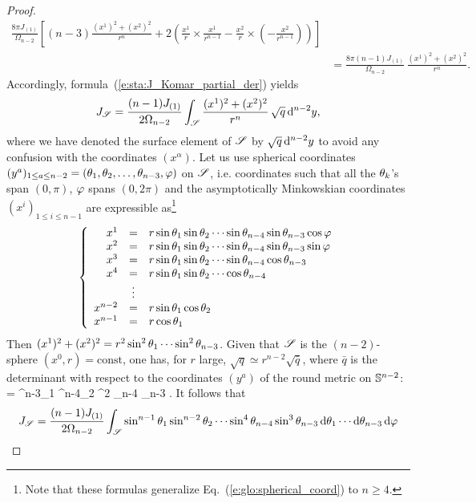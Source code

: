\begin{proof}
\begin{align}
   \frac{8\pi J_{(1)}}{\Omega_{n-2}} \left[
   (n-3) \frac{(x^1)^2 + (x^2)^2}{r^n} + 2 \left( \frac{x^1}{r}\times \frac{x^1}{r^{n-1}}
   - \frac{x^2}{r}\times \left(- \frac{x^2}{r^{n-1}} \right) \right) \right] \nonumber \\
   & = \frac{8\pi (n-1) J_{(1)}}{\Omega_{n-2}} \, \frac{(x^1)^2 + (x^2)^2}{r^n} . \nonumber
\end{align}
Accordingly, formula~(\ref{e:sta:J_Komar_partial_der}) yields
\[
    J_{\mathscr{S}} =  \frac{(n-1)J_{(1)}}{2\Omega_{n-2}}  \int_{\mathscr{S}}
    \frac{(x^1)^2 + (x^2)^2}{r^n} \, \sqrt{q}\, \mathrm{d}^{n-2} y ,
\]
where we have denoted the surface element of $\mathscr{S}$ by $\sqrt{q} \, \mathrm{d}^{n-2} y$
to avoid any
confusion with the coordinates $(x^\alpha)$.
Let us use spherical coordinates $(y^a)_{1\leq a \leq n-2} = (\theta_1,\theta_2,\ldots,\theta_{n-3},\varphi)$
on $\mathscr{S}$, i.e. coordinates such that all the $\theta_k$'s span $(0,\pi)$,
$\varphi$ spans $(0,2\pi)$
and the asymptotically Minkowskian coordinates
$(x^i)_{1\leq i \leq n-1}$ are expressible as\footnote{Note that these formulas generalize
Eq.~(\ref{e:glo:spherical_coord}) to $n\geq 4$.}
\[
    \left\{ \begin{array}{rcl}
    x^1 & = & r \sin\theta_1 \sin\theta_2 \cdots \sin \theta_{n-4} \sin \theta_{n-3} \cos\varphi \\
    x^2 & = & r \sin\theta_1 \sin\theta_2 \cdots \sin \theta_{n-4} \sin \theta_{n-3} \sin\varphi \\
    x^3 & = & r \sin\theta_1 \sin\theta_2 \cdots \sin \theta_{n-4} \cos \theta_{n-3} \\
    x^4 & = & r \sin\theta_1 \sin\theta_2 \cdots \cos \theta_{n-4} \\
     &\vdots & \\
    x^{n-2} & = & r \sin\theta_1 \cos\theta_2 \\
    x^{n-1} & = & r \cos\theta _1
     \end{array} \right .
\]
Then $(x^1)^2 + (x^2)^2 = r^2 \sin^2\theta_1 \cdots \sin^2 \theta_{n-3}$.
Given that $\mathscr{S}$ is the $(n-2)$-sphere $(x^0,r) = \mathrm{const}$, one has,
for $r$ large, $\sqrt{q} \simeq r^{n-2} \sqrt{\bar{q}}$,
where $\bar{q}$ is the determinant with respect to the coordinates
$(y^a)$ of the round metric on $\mathbb{S}^{n-2}$:
\be \label{e:sta:sqrt_barq_spher}
  = \sin^{n-3}\th_1 \sin^{n-4}\th_2 \cdots \sin^2 \th_{n-4} \sin \th_{n-3} .
\ee
It follows that
\begin{align}
    J_{\Sp} &=  \frac{(n-1)J_{(1)}}{2\Omega_{n-2}}  \int_{\Sp}
     \sin^{n-1}\th_1 \sin^{n-2}\th_2 \cdots \sin^4 \th_{n-4} \sin^3 \th_{n-3}
     \, \D \th_1 \cdots \D \th_{n-3} \, \D \ph \nonumber  \\

\end{align}
\end{proof}
